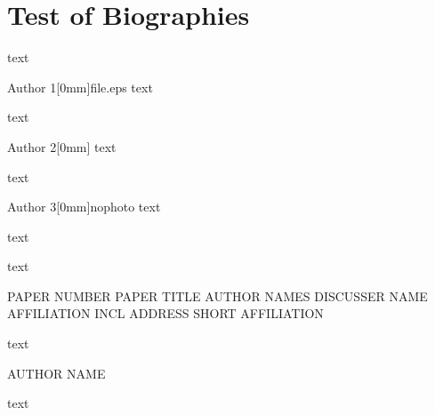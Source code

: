\documentclass[10pt,twoside%
		,draft%
	]{article}
\begin{document}




\section{Test of Biographies}

text

\begin{biography}{Author 1}[0mm]{file.eps}
text

text
\end{biography}

\begin{biography}{Author 2}[0mm]{}
text

text
\end{biography}

\begin{biography}{Author 3}[0mm]{nophoto}
text

text
\end{biography}





\summary

text



\begin{discussion}
	{PAPER NUMBER}%
	{PAPER TITLE}%
	{AUTHOR NAMES}%
	{DISCUSSER NAME}%
	{AFFILIATION INCL ADDRESS}%
	{SHORT AFFILIATION}

text

\end{discussion}



\begin{closure}{AUTHOR NAME}

text

\end{closure}
\end{document}
